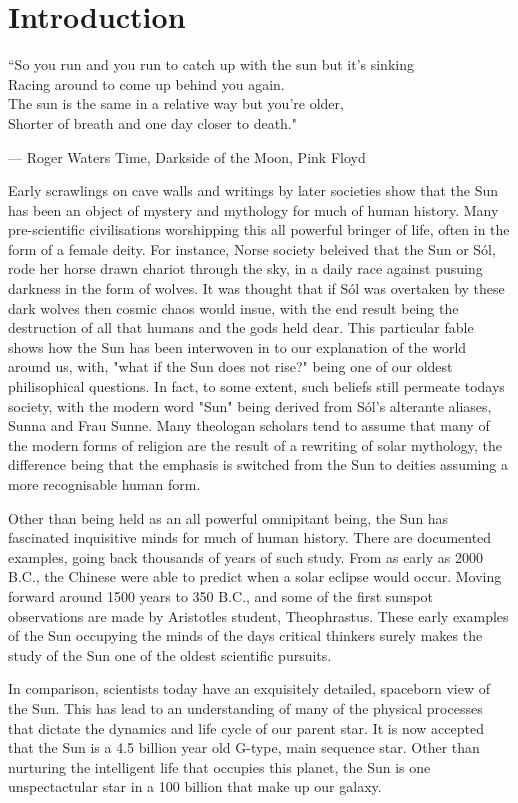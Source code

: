 \section{Introduction}

\epigraphfontsize{\small\itshape}
\epigraph{``So you run and you run to catch up with the sun but it's sinking \\
Racing around to come up behind you again. \\
The sun is the same in a relative way but you're older, \\
Shorter of breath and one day closer to death."}{--- \textup{Roger Waters} Time, Darkside of the Moon, Pink Floyd}


Early scrawlings on cave walls and writings by later societies show that the Sun has been an object of mystery and mythology for much of human history. Many pre-scientific civilisations worshipping this all powerful bringer of life, often in the form of a female deity. For instance, Norse society beleived that the Sun or Sól, rode her horse drawn chariot through the sky, in a daily race against pusuing darkness in the form of wolves. It was thought that if Sól was overtaken by these dark wolves then cosmic chaos would insue, with the end result being the destruction of all that humans and the gods held dear. This particular fable shows how the Sun has been interwoven in to our explanation of the world around us, with, "what if the Sun does not rise?" being one of our oldest philisophical questions. In fact, to some extent, such beliefs still permeate todays society, with the modern word "Sun" being derived from Sól's alterante aliases, Sunna and Frau Sunne. Many theologan scholars tend to assume that many of the modern forms of religion are the result of a rewriting of solar mythology, the difference being that the emphasis is switched from the Sun to deities assuming a more recognisable human form.  


Other than being held as an all powerful omnipitant being, the Sun has fascinated inquisitive minds for much of human history. There are documented examples, going back thousands of years of such study. From as early as 2000 B.C., the Chinese were able to predict when a solar eclipse would occur. Moving forward around 1500 years to 350 B.C., and some of the first sunspot observations are made by Aristotles student, Theophrastus. These early examples of the Sun occupying the minds of the days critical thinkers surely makes the study of the Sun one of the oldest scientific pursuits.      


In comparison, scientists today have an exquisitely detailed, spaceborn view of the Sun. This has lead to an understanding of many of the physical processes that dictate the dynamics and life cycle of our parent star. It is now accepted that the Sun is a 4.5 billion year old G-type, main sequence star. Other than nurturing the intelligent life that occupies this planet, the Sun is one unspectactular star in a 100 billion that make up our galaxy.

